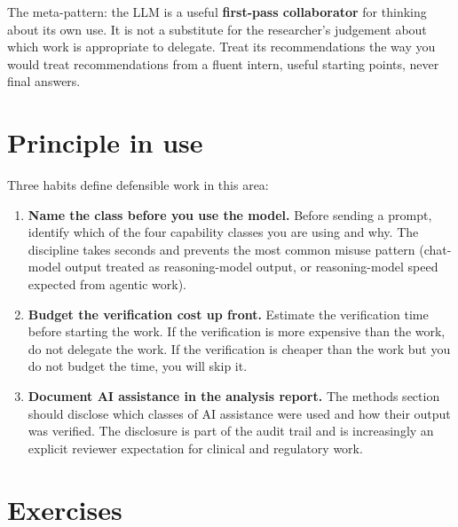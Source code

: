 \documentclass[
  letterpaper,
  11pt]{scrbook}
\begin{document}
The meta-pattern: the LLM is a useful \textbf{first-pass collaborator}
for thinking about its own use. It is not a substitute for the
researcher's judgement about which work is appropriate to delegate.
Treat its recommendations the way you would treat recommendations from a
fluent intern, useful starting points, never final answers.

\section{Principle in use}\label{principle-in-use-1}

Three habits define defensible work in this area:

\begin{enumerate}
\def\labelenumi{\arabic{enumi}.}
\item
  \textbf{Name the class before you use the model.} Before sending a
  prompt, identify which of the four capability classes you are using
  and why. The discipline takes seconds and prevents the most common
  misuse pattern (chat-model output treated as reasoning-model output,
  or reasoning-model speed expected from agentic work).
\item
  \textbf{Budget the verification cost up front.} Estimate the
  verification time before starting the work. If the verification is
  more expensive than the work, do not delegate the work. If the
  verification is cheaper than the work but you do not budget the time,
  you will skip it.
\item
  \textbf{Document AI assistance in the analysis report.} The methods
  section should disclose which classes of AI assistance were used and
  how their output was verified. The disclosure is part of the audit
  trail and is increasingly an explicit reviewer expectation for
  clinical and regulatory work.
\end{enumerate}

\section{Exercises}\label{exercises-1}
\end{document}
